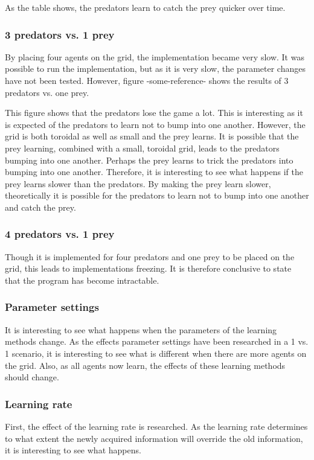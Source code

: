 As the table shows, the predators learn to catch the prey quicker over time.

\subsubsection{3 predators vs. 1 prey}
By placing four agents on the grid, the implementation became very slow. It was possible to run the implementation, but as it is very slow, the parameter changes have not been tested. However, figure -some-reference- shows the results of 3 predators vs. one prey.

This figure shows that the predators lose the game a lot. This is interesting as it is expected of the predators to learn not to bump into one another. However, the grid is both toroidal as well as small and the prey learns. It is possible that the prey learning, combined with a small, toroidal grid, leads to the predators bumping into one another. Perhaps the prey learns to trick the predators into bumping into one another. Therefore, it is interesting to see what happens if the prey learns slower than the predators. By making the prey learn slower, theoretically it is possible for the predators to learn not to bump into one another and catch the prey. 

\subsubsection{4 predators vs. 1 prey}
Though it is implemented for four predators and one prey to be placed on the grid, this leads to implementations freezing. It is therefore conclusive to state that the program has become intractable. 

\subsubsection{Parameter settings}
It is interesting to see what happens when the parameters of the learning methods change. As the effects parameter settings have been researched in a 1 vs. 1 scenario, it is interesting to see what is different when there are more agents on the grid. Also, as all agents now learn, the effects of these learning methods should change.

\subsubsection{Learning rate}
First, the effect of the learning rate is researched. As the learning rate determines to what extent the newly acquired information will override the old information, it is interesting to see what happens. 

